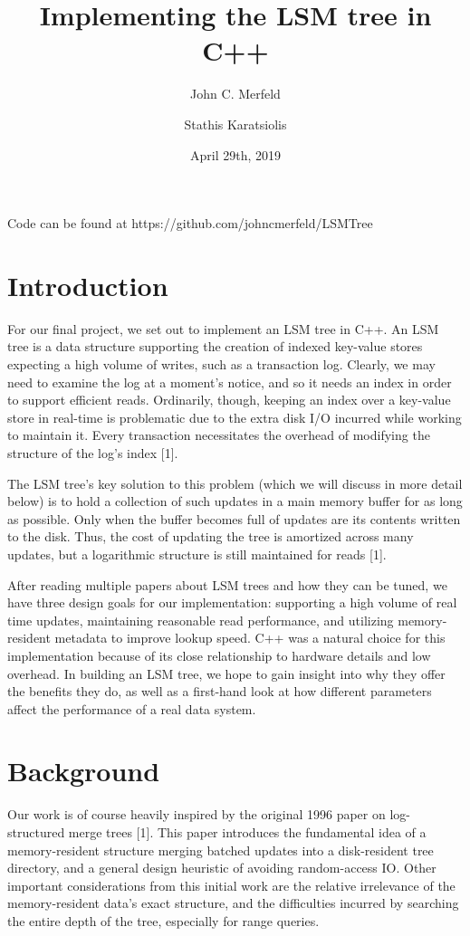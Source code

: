 \documentclass[12pt]{article}
\title{Implementing the LSM tree in C++}
\date{April 29th, 2019}
\author{John C. Merfeld
\and Stathis Karatsiolis}
\begin{document}
\maketitle

Code can be found at https://github.com/johncmerfeld/LSMTree

\section{Introduction}
\indent \indent For our final project, we set out to implement an LSM tree in C++. An LSM tree is a data structure supporting the creation of indexed key-value stores expecting a high volume of writes, such as a transaction log. Clearly, we may need to examine the log at a moment's notice, and so it needs an index in order to support efficient reads. Ordinarily, though, keeping an index over a key-value store in real-time is problematic due to the extra disk I/O incurred while working to maintain it. Every transaction necessitates the overhead of modifying the structure of the log's index [1].

The LSM tree's key solution to this problem (which we will discuss in more detail below) is to hold a collection of such updates in a main memory buffer for as long as possible. Only when the buffer becomes full of updates are its contents written to the disk. Thus, the cost of updating the tree is amortized across many updates, but a logarithmic structure is still maintained for reads [1].

After reading multiple papers about LSM trees and how they can be tuned, we have three design goals for our implementation: supporting a high volume of real time updates, maintaining reasonable read performance, and utilizing memory-resident metadata to improve lookup speed. C++ was a natural choice for this implementation because of its close relationship to hardware details and low overhead. In building an LSM tree, we hope to gain insight into why they offer the benefits they do, as well as a first-hand look at how different parameters affect the performance of a real data system. 

\section{Background}
\indent \indent Our work is of course heavily inspired by the original 1996 paper on log-structured merge trees [1]. This paper introduces the fundamental idea of a memory-resident structure merging batched updates into a disk-resident tree directory, and a general design heuristic of avoiding random-access IO. Other important considerations from this initial work are the relative irrelevance of the memory-resident data's exact structure, and the difficulties incurred by searching the entire depth of the tree, especially for range queries.
\end{document}
